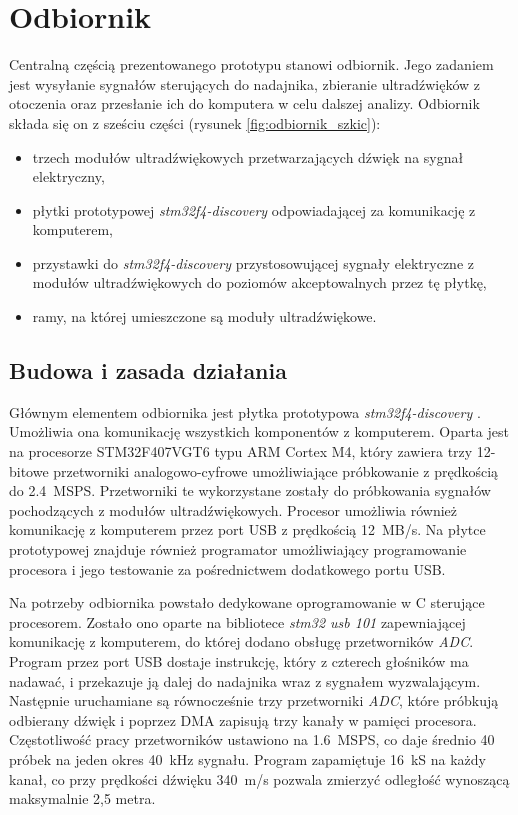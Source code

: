 \chapter{Odbiornik}

Centralną częścią prezentowanego prototypu stanowi odbiornik.
Jego zadaniem jest wysyłanie sygnałów sterujących do nadajnika, zbieranie ultradźwięków z otoczenia oraz przesłanie 
ich do komputera w celu dalszej analizy.
Odbiornik składa się on z sześciu części (rysunek \ref{fig:odbiornik_szkic}):

\begin{itemize}
 \item trzech modułów ultradźwiękowych przetwarzających dźwięk na sygnał elektryczny,
 \item płytki prototypowej \textit{stm32f4-discovery} \cite{bib:stm32f4Discovery} odpowiadającej za komunikację z komputerem,
 \item przystawki do \textit{stm32f4-discovery} przystosowującej sygnały elektryczne z modułów ultradźwiękowych
  do poziomów akceptowalnych przez tę płytkę,
 \item ramy, na której umieszczone są moduły ultradźwiękowe.
\end{itemize}




\section{Budowa i zasada działania}

Głównym elementem odbiornika jest płytka prototypowa \textit{stm32f4-discovery} \cite{bib:stm32f4Discovery}.
 Umożliwia ona komunikację wszystkich komponentów z komputerem.
Oparta jest na procesorze STM32F407VGT6 \cite{bib:stm32f407} typu ARM Cortex M4, 
który zawiera trzy 12-bitowe przetworniki
analogowo-cyfrowe umożliwiające próbkowanie z prędkością do \SI{2,4}{MSPS}. Przetworniki te wykorzystane zostały do próbkowania
sygnałów pochodzących z modułów ultradźwiękowych. Procesor umożliwia również komunikację z komputerem przez 
port USB z prędkością \SI{12}{MB/s}. Na płytce prototypowej znajduje również programator
umożliwiający programowanie procesora i jego testowanie za pośrednictwem dodatkowego portu USB.

Na potrzeby odbiornika powstało dedykowane oprogramowanie w C sterujące procesorem.
Zostało ono oparte na bibliotece \textit{stm32 usb 101} \cite{bib:stm32_usb_101}
zapewniającej komunikację z komputerem, do której dodano obsługę przetworników \textit{ADC}.
Program przez port USB dostaje instrukcję, który z czterech głośników ma nadawać, i przekazuje ją
dalej do nadajnika wraz z sygnałem wyzwalającym. Następnie uruchamiane są równocześnie trzy przetworniki \textit{ADC}, które 
próbkują odbierany dźwięk i poprzez DMA zapisują trzy kanały w pamięci procesora.
Częstotliwość pracy przetworników ustawiono na \SI{1,6}{MSPS}, co daje średnio 40 próbek na jeden okres \SI{40}{kHz} sygnału.
Program zapamiętuje \SI{16}{kS} na każdy kanał, co przy prędkości dźwięku \SI{340}{m/s} pozwala zmierzyć odległość
wynoszącą maksymalnie 2,5 metra.


